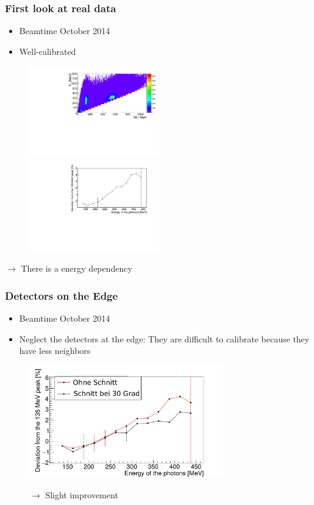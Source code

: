 \documentclass[slidestop,compress,mathserif]{beamer}
\begin{document}
\begin{frame}
	\frametitle{First look at real data}
	
	\begin{itemize}
		\item Beamtime October 2014
		\item Well-calibrated 
\end{itemize}
	
		\begin{figure}
		
		\includegraphics[width=0.50\textwidth]{Pictures/20171904Uncharged2DHist}
		\hfill
		\includegraphics[width=0.50\textwidth]{Pictures/20170405StrahlzeitDeviatoinNoCut}
		
	\end{figure}
$\rightarrow$ There is a energy dependency	
\end{frame}

\begin{frame}
	\frametitle{Detectors on the Edge}
	
	\begin{itemize}
		\item Beamtime October 2014
		\item Neglect the detectors at the edge: They are difficult to calibrate because they have less neighbors
	\end{itemize}

\begin{figure}
	\includegraphics[width=0.75\textwidth]{Pictures/20170405StrahlzeitBothDeviation}
	
	$\rightarrow$ Slight improvement
\end{figure}
	
\end{frame}
\end{document}
